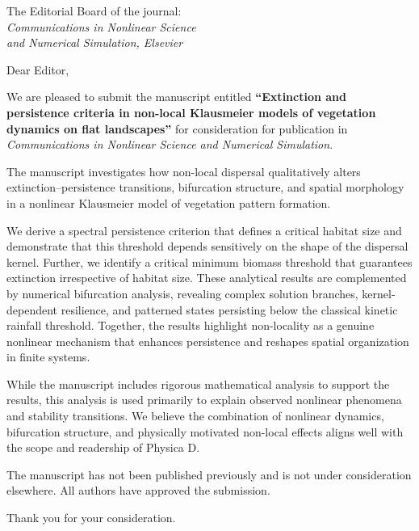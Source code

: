 \documentclass[11pt,a4paper]{letter}
\date{\today}
\begin{document}
\begin{letter}{
    The Editorial Board of the journal: 
    \textit{ \\ Communications in Nonlinear Science \\ and Numerical Simulation, Elsevier}
}

\opening{Dear Editor,}

We are pleased to submit the manuscript entitled \textbf{``Extinction and persistence criteria in non-local Klausmeier models of vegetation dynamics on flat landscapes''} for consideration for publication in \textit{Communications in Nonlinear Science and Numerical Simulation}.

The manuscript investigates how non-local dispersal qualitatively alters extinction–persistence transitions, bifurcation structure, and spatial morphology in a nonlinear Klausmeier model of vegetation pattern formation. 

We derive a spectral persistence criterion that defines a critical habitat size and demonstrate that this threshold depends sensitively on the shape of the dispersal kernel. Further, we identify a critical minimum biomass threshold that guarantees extinction irrespective of habitat size.  These analytical results are complemented by numerical bifurcation analysis, revealing complex solution branches, kernel-dependent resilience, and patterned states persisting below the classical kinetic rainfall threshold. Together, the results highlight non-locality as a genuine nonlinear mechanism that enhances persistence and reshapes spatial organization in finite systems.

While the manuscript includes rigorous mathematical analysis to support the results, this analysis is used primarily to explain observed nonlinear phenomena and stability transitions. We believe the combination of nonlinear dynamics, bifurcation structure, and physically motivated non-local effects aligns well with the scope and readership of Physica D.

The manuscript has not been published previously and is not under consideration elsewhere. All authors have approved the submission.

Thank you for your consideration.


\end{letter}
\end{document}
